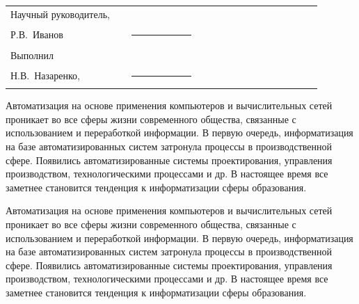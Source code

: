 \documentclass[utf8,usehyperref,12pt]{G7-32}
\begin{document}

\frontmatter %



\Executors %
\begin{longtable}{p{0.35\linewidth}p{0.2\linewidth}p{0.35\linewidth}}
Научный руководитель, 	&		&	\\
Р.В.~Иванов	&\rule{1\linewidth}{0.1pt}	&  \\ \vspace{1cm}

Выполнил  &		&	\\
Н.В.~Назаренко, & \rule{1\linewidth}{0.1pt}& \\
\end{longtable}



\tableofcontents



\Introduction

Автоматизация на основе применения компьютеров и вычислительных сетей проникает во все сферы жизни современного общества, связанные с использованием и переработкой информации. В первую очередь, информатизация на базе автоматизированных систем затронула процессы в производственной сфере. Появились автоматизированные системы проектирования, управления производством, технологическими процессами и др. В настоящее время все заметнее становится тенденция к информатизации сферы образования.

Автоматизация на основе применения компьютеров и вычислительных сетей проникает во все сферы жизни современного общества, связанные с использованием и переработкой информации. В первую очередь, информатизация на базе автоматизированных систем затронула процессы в производственной сфере. Появились автоматизированные системы проектирования, управления производством, технологическими процессами и др. В настоящее время все заметнее становится тенденция к информатизации сферы образования.
\end{document}
